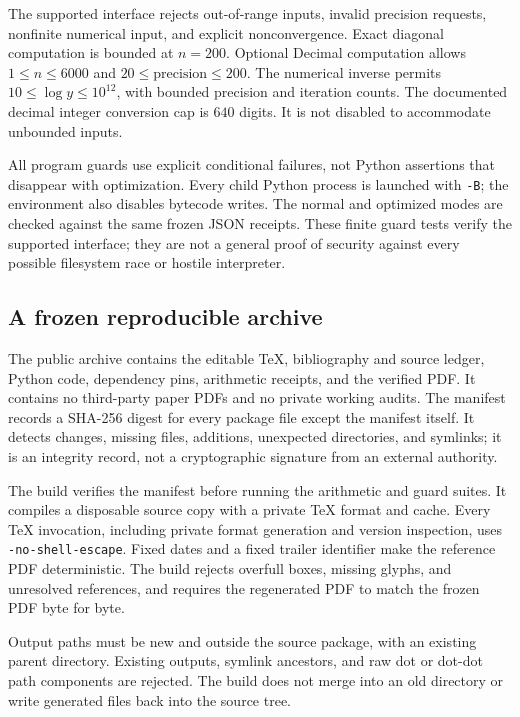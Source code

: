 The supported interface rejects out-of-range inputs, invalid precision requests, nonfinite numerical input, and explicit nonconvergence. Exact diagonal computation is bounded at $n=200$. Optional Decimal computation allows $1\leq n\leq6000$ and $20\leq\text{precision}\leq200$. The numerical inverse permits $10\leq\log y\leq10^{12}$, with bounded precision and iteration counts. The documented decimal integer conversion cap is $640$ digits. It is not disabled to accommodate unbounded inputs.

All program guards use explicit conditional failures, not Python assertions that disappear with optimization. Every child Python process is launched with \texttt{-B}; the environment also disables bytecode writes. The normal and optimized modes are checked against the same frozen JSON receipts. These finite guard tests verify the supported interface; they are not a general proof of security against every possible filesystem race or hostile interpreter.

\subsection{A frozen reproducible archive}
The public archive contains the editable TeX, bibliography and source ledger, Python code, dependency pins, arithmetic receipts, and the verified PDF. It contains no third-party paper PDFs and no private working audits. The manifest records a SHA-256 digest for every package file except the manifest itself. It detects changes, missing files, additions, unexpected directories, and symlinks; it is an integrity record, not a cryptographic signature from an external authority.

The build verifies the manifest before running the arithmetic and guard suites. It compiles a disposable source copy with a private TeX format and cache. Every TeX invocation, including private format generation and version inspection, uses \texttt{-no-shell-escape}. Fixed dates and a fixed trailer identifier make the reference PDF deterministic. The build rejects overfull boxes, missing glyphs, and unresolved references, and requires the regenerated PDF to match the frozen PDF byte for byte.

Output paths must be new and outside the source package, with an existing parent directory. Existing outputs, symlink ancestors, and raw dot or dot-dot path components are rejected. The build does not merge into an old directory or write generated files back into the source tree.

